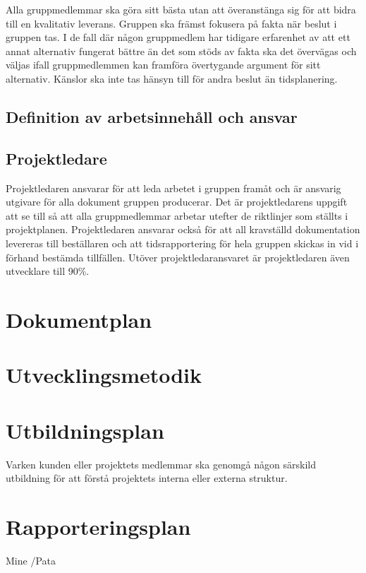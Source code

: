 \documentclass{article}
\begin{document}
\newline\newline
Alla gruppmedlemmar ska göra sitt bästa utan att överanstänga sig för att bidra till en kvalitativ leverans.
\newline\newline
Gruppen ska främst fokusera på fakta när beslut i gruppen tas. I de fall där någon gruppmedlem har tidigare erfarenhet av att ett annat alternativ fungerat bättre än det som stöds av fakta ska det övervägas och väljas ifall gruppmedlemmen kan framföra övertygande argument för sitt alternativ. Känslor ska inte tas hänsyn till för andra beslut än tidsplanering.

\subsection{Definition av arbetsinnehåll och ansvar}
\subsection{Projektledare}
Projektledaren ansvarar för att leda arbetet i gruppen framåt och är ansvarig utgivare för alla dokument gruppen producerar. Det är projektledarens uppgift att se till så att alla gruppmedlemmar arbetar utefter de riktlinjer som ställts i projektplanen. Projektledaren ansvarar också för att all kravställd dokumentation levereras till beställaren och att tidsrapportering för hela gruppen skickas in vid i förhand bestämda tillfällen. Utöver projektledaransvaret är projektledaren även utvecklare till 90\%.

\section{Dokumentplan}


\section{Utvecklingsmetodik}

\section{Utbildningsplan}
Varken kunden eller projektets medlemmar ska genomgå någon särskild utbildning för att förstå projektets interna eller externa struktur.

\section{Rapporteringsplan}
Mine /Pata
\end{document}

